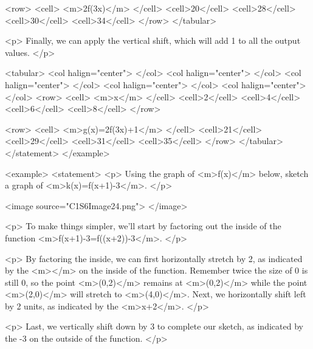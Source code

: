                     <row>
                        <cell> <m>2f(3x)</m> </cell>
                        <cell>20</cell>
                        <cell>28</cell>
                        <cell>30</cell>
                        <cell>34</cell>
                    </row>
                </tabular>

                <p>
                    Finally, we can apply the vertical shift, which will add 1 to all the output values.
                </p>

                <tabular>
                    <col halign="center"> </col> <col halign="center"> </col> <col halign="center"> </col> <col halign="center"> </col> <col halign="center"> </col>
                    <row>
                        <cell> <m>x</m> </cell>
                        <cell>2</cell>
                        <cell>4</cell>
                        <cell>6</cell>
                        <cell>8</cell>
                    </row>

                    <row>
                        <cell> <m>g(x)=2f(3x)+1</m> </cell>
                        <cell>21</cell>
                        <cell>29</cell>
                        <cell>31</cell>
                        <cell>35</cell>
                    </row>
                </tabular>
            </statement>
        </example>

        <example>
            <statement>
                <p>
                    Using the graph of <m>f(x)</m> below, sketch a graph of <m>k(x)=f(x+1)-3</m>.
                </p>

                <image source="C1S6Image24.png">
                </image>

                <p>
                    To make things simpler, we’ll start by factoring out the inside of the function <m>f(x+1)-3=f((x+2))-3</m>.
                </p>

                <p>
                    By factoring the inside, we can first horizontally stretch by 2, as indicated by the <m></m> on the inside of the function.
                    Remember twice the size of 0 is still 0, so the point <m>(0,2)</m> remains at <m>(0,2)</m> while the point <m>(2,0)</m> will stretch to <m>(4,0)</m>.
                    Next, we horizontally shift left by 2 units, as indicated by the <m>x+2</m>.
                </p>

                <p>
                    Last, we vertically shift down by 3 to complete our sketch, as indicated by the -3 on the outside of the function.
                </p>

